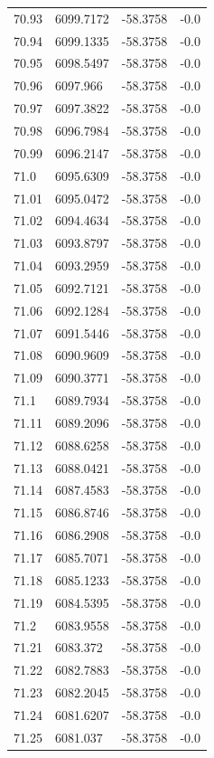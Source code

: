 \begin{table}[H]
\begin{tabular}{llll}
70.93 & 6099.7172 & -58.3758 & -0.0 \\
70.94 & 6099.1335 & -58.3758 & -0.0 \\
70.95 & 6098.5497 & -58.3758 & -0.0 \\
70.96 & 6097.966 & -58.3758 & -0.0 \\
70.97 & 6097.3822 & -58.3758 & -0.0 \\
70.98 & 6096.7984 & -58.3758 & -0.0 \\
70.99 & 6096.2147 & -58.3758 & -0.0 \\
71.0 & 6095.6309 & -58.3758 & -0.0 \\
71.01 & 6095.0472 & -58.3758 & -0.0 \\
71.02 & 6094.4634 & -58.3758 & -0.0 \\
71.03 & 6093.8797 & -58.3758 & -0.0 \\
71.04 & 6093.2959 & -58.3758 & -0.0 \\
71.05 & 6092.7121 & -58.3758 & -0.0 \\
71.06 & 6092.1284 & -58.3758 & -0.0 \\
71.07 & 6091.5446 & -58.3758 & -0.0 \\
71.08 & 6090.9609 & -58.3758 & -0.0 \\
71.09 & 6090.3771 & -58.3758 & -0.0 \\
71.1 & 6089.7934 & -58.3758 & -0.0 \\
71.11 & 6089.2096 & -58.3758 & -0.0 \\
71.12 & 6088.6258 & -58.3758 & -0.0 \\
71.13 & 6088.0421 & -58.3758 & -0.0 \\
71.14 & 6087.4583 & -58.3758 & -0.0 \\
71.15 & 6086.8746 & -58.3758 & -0.0 \\
71.16 & 6086.2908 & -58.3758 & -0.0 \\
71.17 & 6085.7071 & -58.3758 & -0.0 \\
71.18 & 6085.1233 & -58.3758 & -0.0 \\
71.19 & 6084.5395 & -58.3758 & -0.0 \\
71.2 & 6083.9558 & -58.3758 & -0.0 \\
71.21 & 6083.372 & -58.3758 & -0.0 \\
71.22 & 6082.7883 & -58.3758 & -0.0 \\
71.23 & 6082.2045 & -58.3758 & -0.0 \\
71.24 & 6081.6207 & -58.3758 & -0.0 \\
71.25 & 6081.037 & -58.3758 & -0.0 \\

\end{tabular}
\end{table}
